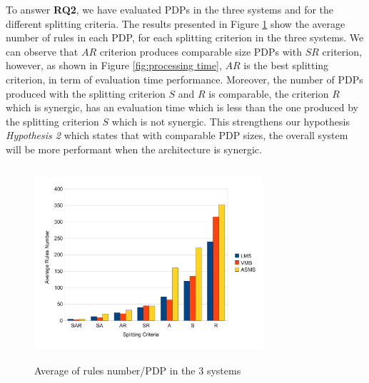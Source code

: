To answer \textbf{RQ2}, we have evaluated PDPs in the three systems and for the different splitting criteria. The results presented in Figure 
\ref{average} show the average number of rules in each PDP, for each splitting criterion in the three systems. We can observe that $AR$ criterion produces comparable size PDPs with $SR$ criterion, however, as shown in Figure 
\ref{fig:processing time}, $AR$ is the best splitting criterion, in term of evaluation time performance. 
Moreover, the number of PDPs produced with the splitting criterion $S$ and $R$ is comparable, the criterion 
$R$ which is synergic, has an evaluation time which is less than the one produced by the splitting criterion $S$ which is not synergic.
This strengthens our hypothesis \textit{Hypothesis 2} which states that with comparable PDP sizes, the overall system will 
be more performant when the architecture is synergic.

\begin{figure}[!h]
\centering
\includegraphics[width=8.5cm, height=7.2cm]{averagerules.pdf}
\begin{center}
\caption{Average of rules number/PDP in the 3 systems}
\label{average}
\end{center}
\end{figure}

